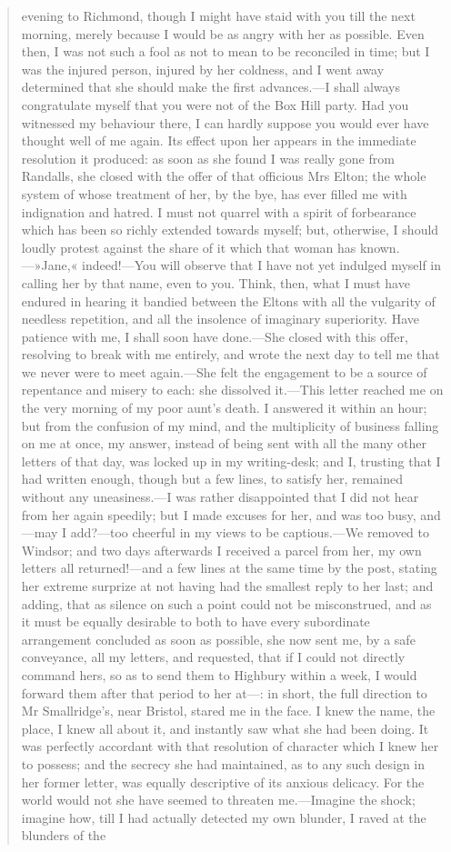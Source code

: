 \begin{quotation}
evening to Richmond, though I might have staid with you till the next morning, merely because I would be as angry with her as possible. Even then, I was not such a fool as not to mean to be reconciled in time; but I was the injured person, injured by her coldness, and I went away determined that she should make the first advances.—I shall always congratulate myself that you were not of the Box Hill party. Had you witnessed my behaviour there, I can hardly suppose you would ever have thought well of me again. Its effect upon her appears in the immediate resolution it produced: as soon as she found I was really gone from Randalls, she closed with the offer of that officious Mrs Elton; the whole system of whose treatment of her, by the bye, has ever filled me with indignation and hatred. I must not quarrel with a spirit of forbearance which has been so richly extended towards myself; but, otherwise, I should loudly protest against the share of it which that woman has known.—»Jane,« indeed!—You will observe that I have not yet indulged myself in calling her by that name, even to you. Think, then, what I must have endured in hearing it bandied between the Eltons with all the vulgarity of needless repetition, and all the insolence of imaginary superiority. Have patience with me, I shall soon have done.—She closed with this offer, resolving to break with me entirely, and wrote the next day to tell me that we never were to meet again.—She felt the engagement to be a source of repentance and misery to each: she dissolved it.—This letter reached me on the very morning of my poor aunt's death. I answered it within an hour; but from the confusion of my mind, and the multiplicity of business falling on me at once, my answer, instead of being sent with all the many other letters of that day, was locked up in my writing-desk; and I, trusting that I had written enough, though but a few lines, to satisfy her, remained without any uneasiness.—I was rather disappointed that I did not hear from her again speedily; but I made excuses for her, and was too busy, and—may I add?—too cheerful in my views to be captious.—We removed to Windsor; and two days afterwards I received a parcel from her, my own letters all returned!—and a few lines at the same time by the post, stating her extreme surprize at not having had the smallest reply to her last; and adding, that as silence on such a point could not be misconstrued, and as it must be equally desirable to both to have every subordinate arrangement concluded as soon as possible, she now sent me, by a safe conveyance, all my letters, and requested, that if I could not directly command hers, so as to send them to Highbury within a week, I would forward them after that period to her at—: in short, the full direction to Mr Smallridge's, near Bristol, stared me in the face. I knew the name, the place, I knew all about it, and instantly saw what she had been doing. It was perfectly accordant with that resolution of character which I knew her to possess; and the secrecy she had maintained, as to any such design in her former letter, was equally descriptive of its anxious delicacy. For the world would not she have seemed to threaten me.—Imagine the shock; imagine how, till I had actually detected my own blunder, I raved at the blunders of the 
\end{quotation}
